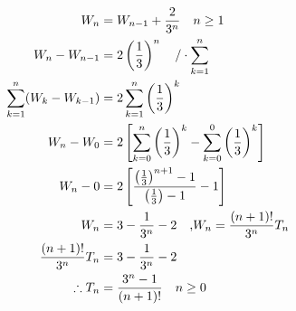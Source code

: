 \begin{solution}
\begin{align*}
    W_n &= W_{n-1} + \frac{2}{3^n} \quad n \ge 1\\
    W_n - W_{n-1} &= 2 \left(\frac{1}{3}\right)^n \quad \text{/}\cdot\sum\limits_{k=1}^{n} \\
    \sum\limits_{k=1}^{n}(W_k - W_{k-1}) &= 2\sum\limits_{k=1}^{n} \left(\frac{1}{3}\right)^k \\
    W_n - W_0 &= 2\left[ \sum\limits_{k=0}^{n} \left(\frac{1}{3}\right)^k - \sum\limits_{k=0}^{0} \left(\frac{1}{3}\right)^k \right] \\
    W_n - 0 &= 2\left[  \frac{\left(\frac{1}{3}\right)^{n+1}-1}{\left(\frac{1}{3}\right)-1} - 1 \right]\\
    W_n &= 3 - \frac{1}{3^n} -2 \quad \text{,}W_n=\frac{(n+1)!}{3^n}T_n\\
    \frac{(n+1)!}{3^n}T_n &= 3 - \frac{1}{3^n} -2\\
    \therefore T_n &= \frac{3^n -1}{(n+1)!} \quad n \ge 0
\end{align*}
\end{solution}